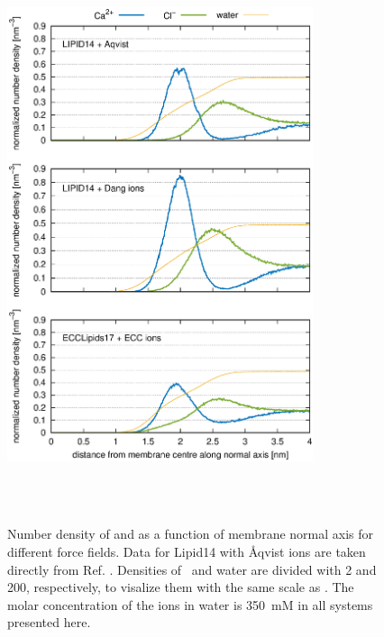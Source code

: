\documentclass[aip,jcp,twocolumn]{revtex4}
\begin{document}
\begin{figure}[tbp]
  \centering
  \includegraphics[width=9.0cm,angle=0]{../Fig/CAdensities2.eps}
  \caption{\label{fig:cacl-dens}
    Number density of  and  as a function of membrane normal axis
    for different force fields. Data for Lipid14 with \AA{}qvist ions are taken directly from Ref. .
    Densities of~ and water are divided with 2 and 200, respectively, to visalize them
    with the same scale as . The molar concentration of the ions in water is 350~mM in all systems
    presented here. 
    }
   \\
   \\
\end{figure}
\end{document}
